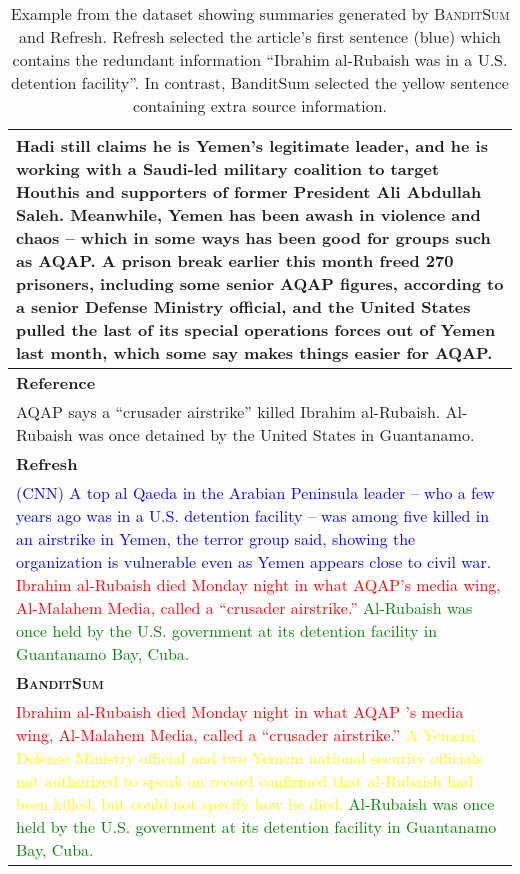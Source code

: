 \documentclass[11pt,a4paper]{article}
\newcommand{\B}{\textsc{BanditSum }}
\begin{document}
\begin{table}[h!]
\begin{center}
\begin{tabularx}{\columnwidth}{|X|}
Hadi still claims he is Yemen's legitimate leader, and he is working with a Saudi-led military coalition to target Houthis and supporters of former President Ali Abdullah Saleh.
Meanwhile, Yemen has been awash in violence and chaos -- which in some ways has been good for groups such as AQAP. A prison break earlier this month freed 270 prisoners, including some senior AQAP figures, according to a senior Defense Ministry official, and the United States pulled the last of its special operations forces out of Yemen last month, which some say makes things easier for AQAP.\\ 
\hline
\textbf{Reference} \\
\hline
AQAP says a ``crusader airstrike'' killed Ibrahim al-Rubaish. Al-Rubaish was once detained by the United States in Guantanamo. \\
\hline
\textbf{Refresh}  \\ 
\hline
\textcolor{blue}{(CNN) A top al Qaeda in the Arabian Peninsula leader -- who a few years ago was in a U.S. detention facility -- was among five killed in an airstrike in Yemen, the terror group said, showing the organization is vulnerable even as Yemen appears close to civil war.} 
\textcolor{red}{Ibrahim al-Rubaish died Monday night in what AQAP's media wing, Al-Malahem Media, called a ``crusader airstrike.''} 
\textcolor{green}{Al-Rubaish was once held by the U.S. government at its detention facility in Guantanamo Bay, Cuba.} \\
\hline
\textbf{\B} \\ 
\hline
\textcolor{red}{Ibrahim al-Rubaish died Monday night in what AQAP 's media wing, Al-Malahem Media, called a ``crusader airstrike.''}
\textcolor{yellow}{A Yemeni Defense Ministry official and two Yemeni national security officials not authorized to speak on record confirmed that al-Rubaish had been killed, but could not specify how he died.} 
\textcolor{green}{Al-Rubaish was once held by the U.S. government at its detention facility in Guantanamo Bay, Cuba.} \\
\hline
\end{tabularx}
\end{center}
\caption{Example from the dataset showing summaries generated by \B and Refresh. Refresh selected the article’s first sentence (blue) which contains the redundant information ``Ibrahim al-Rubaish was in a U.S. detention facility''. In contrast, BanditSum selected the yellow sentence containing extra source information.}
\label{table:sample1}
\end{table}
\end{document}
